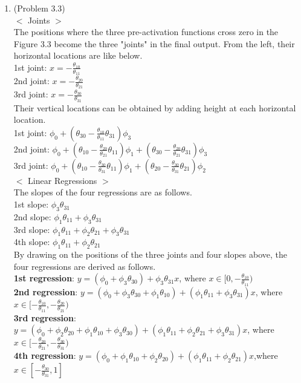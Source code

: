 \documentclass[10pt]{article}
\begin{document}
\begin{enumerate}
\
	
\item (Problem 3.3) \\
	$<$ Joints $>$ \\
	The positions where the three pre-activation functions cross zero in the Figure 3.3 become the three "joints" in the final output. From the left, their horizontal locations are like below. \\
	1st joint: $x=-\frac{\theta_{10}}{\theta_{11}}$ \\
	2nd joint: $x=-\frac{\theta_{20}}{\theta_{21}}$ \\
	3rd joint: $x=-\frac{\theta_{30}}{\theta_{31}}$ \\
	Their vertical locations can be obtained by adding height at each horizontal location. \\
	1st joint: $\phi_0+(\theta_{30}-\frac{\theta_{10}}{\theta_{11}}\theta_{31})\phi_3$ \\
	2nd joint: $\phi_0+(\theta_{10}-\frac{\theta_{20}}{\theta_{21}}\theta_{11})\phi_1+(\theta_{30}-\frac{\theta_{20}}{\theta_{21}}\theta_{31})\phi_3$ \\
	3rd joint: $\phi_0+(\theta_{10}-\frac{\theta_{30}}{\theta_{31}}\theta_{11})\phi_1+(\theta_{20}-\frac{\theta_{30}}{\theta_{31}}\theta_{21})\phi_2$ \\
	
	$<$ Linear Regressions $>$ \\
	The slopes of the four regressions are as follows. \\
	1st slope: $\phi_3\theta_{31}$ \\
	2nd slope: $\phi_1\theta_{11}+\phi_3\theta_{31}$ \\
	3rd slope: $\phi_1\theta_{11}+\phi_2\theta_{21}+\phi_3\theta_{31}$ \\
	4th slope: $\phi_1\theta_{11}+\phi_2\theta_{21}$ \\
	
	By drawing on the positions of the three joints and four slopes above, the four regressions are derived as follows. \\
	\textbf{1st regression}: $y=(\phi_0+\phi_3\theta_{30})+\phi_3\theta_{31}x$, where $x \in [0, -\frac{\theta_{10}}{\theta_{11}})$\\
	\textbf{2nd regression}: $y=(\phi_0+\phi_3\theta_{30}+\phi_1\theta_{10})+(\phi_1\theta_{11}+\phi_3\theta_{31})x$, where $x \in [-\frac{\theta_{10}}{\theta_{11}}, -\frac{\theta_{20}}{\theta_{21}})$ \\
	\textbf{3rd regression}: $y=(\phi_0+\phi_2\theta_{20}+\phi_1\theta_{10}+\phi_3\theta_{30})+(\phi_1\theta_{11}+\phi_2\theta_{21}+\phi_3\theta_{31})x$, where $x \in [-\frac{\theta_{20}}{\theta_{21}}, -\frac{\theta_{30}}{\theta_{31}})$ \\
	\textbf{4th regression}: $y=(\phi_0+\phi_1\theta_{10}+\phi_2\theta_{20})+(\phi_1\theta_{11}+\phi_2\theta_{21})x$,where $x \in [-\frac{\theta_{30}}{\theta_{31}}, 1]$


\end{enumerate}
\end{document}
